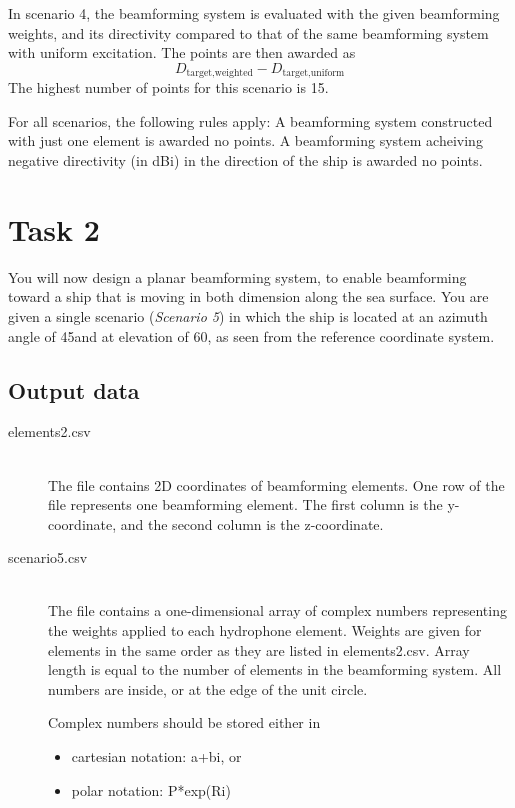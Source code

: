 \documentclass{article}[a4paper]
\begin{document}
In scenario 4, the beamforming system is evaluated with the given beamforming weights, and its directivity compared to that of the same beamforming system with uniform excitation. The points are then awarded as
\[ D_\textrm{target,weighted} - D_\textrm{target,uniform} \]
The highest number of points for this scenario is 15.

For all scenarios, the following rules apply: A beamforming system constructed with just one element is awarded no points. A beamforming system acheiving negative directivity (in dBi) in the direction of the ship is awarded no points.

\section*{Task 2}

You will now design a planar beamforming system, to enable beamforming toward a ship that is moving in both dimension along the sea surface. You are given a single scenario (\textit{Scenario 5}) in which the ship is located at an azimuth angle of 45\textdegree and at elevation of 60\textdegree, as seen from the reference coordinate system.

\subsection*{Output data}

\begin{description}
	\item[elements2.csv] \,\\ The file contains 2D coordinates of beamforming elements. One row of the file represents one beamforming element. The first column is the y-coordinate, and the second column is the z-coordinate.
	
	\item[scenario5.csv] \,\\ The file contains a one-dimensional array of complex numbers representing the weights applied to each hydrophone element. Weights are given for elements in the same order as they are listed in \textsf{elements2.csv}. Array length is equal to the number of elements in the beamforming system. All numbers are inside, or at the edge of the unit circle.
	
	Complex numbers should be stored either in
	\begin{itemize}
		\item cartesian notation: \textsf{a+bi}, or
		\item polar notation: \textsf{P*exp(Ri)}
	\end{itemize}
\end{description}
\end{document}
